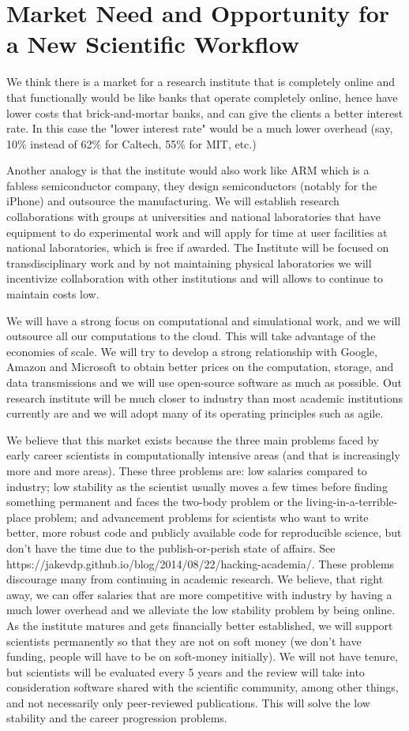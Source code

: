 \section{Market Need and Opportunity for a New Scientific Workflow}
We think there is a market for a research institute that is completely online and that functionally would be like banks that operate completely online, hence have lower costs that brick-and-mortar banks, and can give the clients a better interest rate. In this case the "lower interest rate" would be a much lower overhead (say, 10\% instead of 62\% for Caltech, 55\% for MIT, etc.) 

Another analogy is that the institute would also work like ARM which is a fabless semiconductor company, they design semiconductors (notably for the iPhone) and outsource the manufacturing. We will establish research collaborations with groups at universities and national laboratories that have equipment to do experimental work and will apply for time at user facilities at national laboratories, which is free if awarded. The Institute will be focused on transdisciplinary work and by not maintaining physical laboratories we will incentivize collaboration with other institutions and will allows to continue to maintain costs low. 

We will have a strong focus on computational and simulational work, and we will outsource all our computations to the cloud. This will take advantage of the economies of scale. We will try to develop a strong relationship with Google, Amazon and Microsoft to obtain better prices on the computation, storage, and data transmissions and we will use open-source software as much as possible. Out research institute will be much closer to industry than most academic institutions currently are and we will adopt many of its operating principles such as agile. 

We believe that this market exists because the three main problems faced by early career scientists in computationally intensive areas (and that is increasingly more and more areas). These three problems are: low salaries compared to industry; low stability as the scientist usually moves a few times before finding something permanent and faces the two-body problem or the living-in-a-terrible-place problem; and advancement problems for scientists who want to write better, more robust code and publicly available code for reproducible science, but don't have the time due to the publish-or-perish state of affairs. See https://jakevdp.github.io/blog/2014/08/22/hacking-academia/. These problems discourage many from continuing in academic research. We believe, that right away, we can offer salaries that are more competitive with industry by having a much lower overhead and we alleviate the low stability problem by being online. As the institute matures and gets financially better established, we will support scientists permanently so that they are not on soft money (we don't have funding, people will have to be on soft-money initially). We will not have tenure, but scientists will be evaluated every 5 years and the review will take into consideration software shared with the scientific community, among other things, and not necessarily only peer-reviewed publications. This will solve the low stability and the career progression problems.